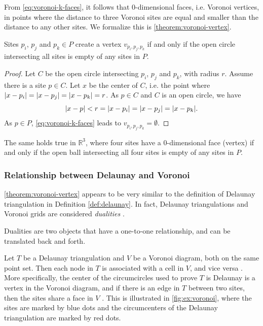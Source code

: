 From \autoref{eq:voronoi-k-faces}, it follows that 0-dimensional faces, i.e. Voronoi vertices, in points where the distance to three Voronoi sites are equal and smaller than the distance to any other sites. We formalize this is \autoref{theorem:voronoi-vertex}.

\begin{theorem}
\label{theorem:voronoi-vertex}
Sites $p_i$, $p_j$ and $p_k \in P$ create a vertex $v_{p_i, p_j, p_k}$ if and only if the open circle intersecting all sites is empty of any sites in $P$. 
\end{theorem}
\begin{proof}
Let $C$ be the open circle intersecting $p_i$, $p_j$ and $p_k$, with radius $r$. Assume there is a site $p \in C$. Let $x$ be the center of $C$, i.e. the point where $\lvert x - p_i\rvert = \lvert x - p_j\rvert = \lvert x - p_k\rvert = r$. As $p \in C$ and $C$ is an open circle, we have
\begin{equation*}
    \lvert x - p\rvert < r = \lvert x - p_i\rvert = \lvert x - p_j\rvert = \lvert x - p_k\rvert.
\end{equation*}
As $p \in P$, \autoref{eq:voronoi-k-faces} leads to $v_{p_i, p_j, p_k} = \emptyset$.
\end{proof}
The same holds true in $\mathbb{R}^3$, where four sites have a 0-dimensional face (vertex) if and only if the open ball intersecting all four sites is empty of any sites in $P$.

\subsubsection{Relationship between Delaunay and Voronoi}
\autoref{theorem:voronoi-vertex} appears to be very similar to the definition of Delaunay triangulation in Definition \ref{def:delaunay}. In fact, Delaunay triangulations and Voronoi grids are considered \emph{dualities} \cite{UPR_chapter}.

\begin{definition}[Dualities]
Dualities are two objects that have a one-to-one relationship, and can be translated back and forth.
\end{definition}

Let $T$ be a Delaunay triangulation and $V$ be a Voronoi diagram, both on the same point set. Then each node in $T$ is associated with a cell in $V$, and vice versa \cite{UPR_chapter}. More specifically, the center of the circumcircles used to prove $T$ is Delaunay is a vertex in the Voronoi diagram, and if there is an edge in $T$ between two sites, then the sites share a face in $V$ \cite{UPR_chapter}. This is illustrated in \autoref{fig:ex:voronoi}, where the sites are marked by blue dots and the circumcenters of the Delaunay triangulation are marked by red dots.


